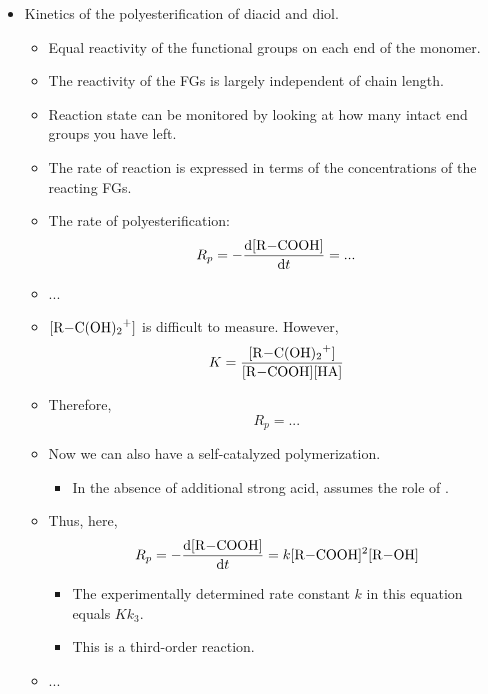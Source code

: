 \documentclass[../notes.tex]{subfiles}
\begin{document}
\begin{itemize}
\begin{itemize}
    \end{itemize}
    \item Kinetics of the polyesterification of diacid and diol.
    \begin{itemize}
        \item Equal reactivity of the functional groups on each end of the monomer.
        \item The reactivity of the FGs is largely independent of chain length.
        \item Reaction state can be monitored by looking at how many intact end groups you have left.
        \item The rate of reaction is expressed in terms of the concentrations of the reacting FGs.
        \item The rate of polyesterification:
        \begin{equation*}
            R_p = -\dv{[\ce{R-COOH}]}{t} = ...
        \end{equation*}
        \item ...
        \item $[\ce{R-C(OH)2+}]$ is difficult to measure. However,
        \begin{equation*}
            K = \frac{[\ce{R-C(OH)2+}]}{[\ce{R-COOH}][\ce{HA}]}
        \end{equation*}
        \item Therefore,
        \begin{equation*}
            R_p = ...
        \end{equation*}
        \item Now we can also have a self-catalyzed polymerization.
        \begin{itemize}
            \item In the absence of additional strong acid,  assumes the role of .
        \end{itemize}
        \item Thus, here,
        \begin{equation*}
            R_p = -\dv{[\ce{R-COOH}]}{t} = k[\ce{R-COOH}]^2[\ce{R-OH}]
        \end{equation*}
        \begin{itemize}
            \item The experimentally determined rate constant $k$ in this equation equals $Kk_3$.
            \item This is a third-order reaction.
        \end{itemize}
        \item ...

\end{itemize}
\end{itemize}
\end{document}
